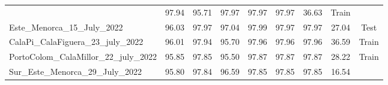 \begin{table}[H]
{\begin{tabular}{lcccccccc}
                                                   & 97.94
                                                   & 95.71
                                                   & 97.97
                                                   & 97.97
                                                   & 97.97
                                                   & 36.63
                                                   & {\color[HTML]{66c2a5}
                    Train}
            \\
            Este\_Menorca\_15\_July\_2022          & 96.03
                                                   & 97.97
                                                   & 97.04
                                                   & 97.99
                                                   & 97.97
                                                   & 97.97
                                                   & 27.04
                                                   & {\color[HTML]{fc8d62}
                    Test}
            \\
            CalaPi\_CalaFiguera\_23\_july\_2022    & 96.01
                                                   & 97.94
                                                   & 95.70
                                                   & 97.96
                                                   & 97.96
                                                   & 97.96
                                                   & 36.59
                                                   & {\color[HTML]{66c2a5}
                    Train}
            \\
            PortoColom\_CalaMillor\_22\_july\_2022 & 95.85
                                                   & 97.85
                                                   & 95.50
                                                   & 97.87
                                                   & 97.87
                                                   & 97.87
                                                   & 28.22
                                                   & {\color[HTML]{66c2a5}
                    Train}
            \\
            Sur\_Este\_Menorca\_29\_July\_2022     & 95.80
                                                   & 97.84
                                                   & 96.59
                                                   & 97.85
                                                   & 97.85
                                                   & 97.85
                                                   & 16.54

\end{tabular}}
\end{table}
